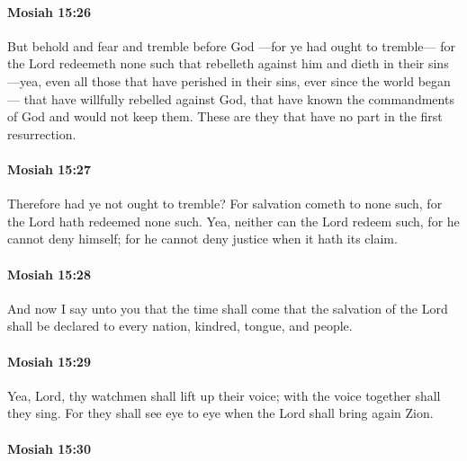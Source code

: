 		\paragraph{Mosiah 15:26} %
			\label{MOSIAH-15-26}

			But behold and fear and tremble before God
			---for ye had ought to tremble---
			for the Lord redeemeth none such
			that rebelleth against him and dieth in their sins
			---yea, even all those that have perished in their sins,
			ever since the world began---
			that have willfully rebelled against God,
			that have known the commandments of God and would not keep them.
			These are they that have no part in the first resurrection.

		\paragraph{Mosiah 15:27} %
			\label{MOSIAH-15-27}

			Therefore had ye not ought to tremble?
			For salvation cometh to none such,
			for the Lord hath redeemed none such.
			Yea, neither can the Lord redeem such,
			for he cannot deny himself;
			for he cannot deny justice when it hath its claim.

		\paragraph{Mosiah 15:28} %
			\label{MOSIAH-15-28}

			And now I say unto you that the time shall come
			that the salvation of the Lord shall be declared
			to every nation, kindred, tongue, and people.

		\paragraph{Mosiah 15:29} %
			\label{MOSIAH-15-29}

			Yea, Lord, thy watchmen shall lift up their voice;
			with the voice together shall they sing.
			For they shall see eye to eye when the Lord shall bring again Zion.

		\paragraph{Mosiah 15:30} %
			\label{MOSIAH-15-30}

